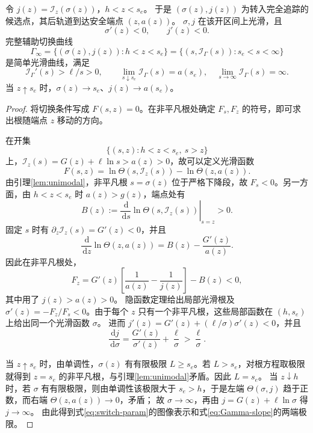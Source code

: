 \documentclass[lang=cn,a4paper,newtx]{elegantpaper}
\theoremstyle{plain}
\theoremstyle{definition}
\newcommand{\dd}{\,\mathrm d}
\begin{document}
\begin{proposition}[非平凡切换曲线的全分支]
\label{prop:Gamma-geometry}
令 $j(z)=\mathcal I_z(\sigma(z))$，$h<z<s_e$。
于是 $(\sigma(z),j(z))$ 为转入完全追踪的候选点，其后轨道到达安全端点 $(z,a(z))$。
$\sigma,j$ 在该开区间上光滑，且
\begin{equation}
\sigma'(z)<0,\qquad j'(z)<0.
\label{eq:sigma-monotone}
\end{equation}
完整辅助切换曲线
\begin{equation}
\Gamma_\infty=\{(\sigma(z),j(z)):h<z<s_e\}
=\{(s,\mathcal I_\Gamma(s)):s_e<s<\infty\}
\label{eq:switch-param}
\end{equation}
是简单光滑曲线，满足
\begin{equation}
\mathcal I_\Gamma'(s)>\ell/s>0,
\qquad
\lim_{s\downarrow s_e}\mathcal I_\Gamma(s)=a(s_e),\quad
\lim_{s\to\infty}\mathcal I_\Gamma(s)=\infty.
\label{eq:Gamma-slope}
\end{equation}
当 $z\uparrow s_e$ 时，$\sigma(z)\to s_e$、$j(z)\to a(s_e)$。
\end{proposition}
\begin{proof}
将切换条件写成 $F(s,z)=0$。在非平凡根处确定 $F_s,F_z$ 的符号，即可求出根随端点 $z$ 移动的方向。

在开集
\[
\{(s,z):h<z<s_e,\ s>z\}
\]
上，$\mathcal I_z(s)=G(z)+\ell\ln s>a(z)>0$，故可以定义光滑函数
\[
F(s,z)=\ln\Theta(s,\mathcal I_z(s))-\ln\Theta(z,a(z)).
\]
由引理\ref{lem:unimodal}，非平凡根 $s=\sigma(z)$ 位于严格下降段，故 $F_s<0$。另一方面，由 $h<z<s_e$ 时 $a(z)>g(z)$，端点处有
\[
B(z):=\left.\frac{\dd}{\dd s}\ln\Theta(s,\mathcal I_z(s))\right|_{s=z}>0.
\]
固定 $s$ 时有 $\partial_z\mathcal I_z(s)=G'(z)<0$，并且
\[
\frac{\dd}{\dd z}\ln\Theta(z,a(z))=B(z)-\frac{G'(z)}{a(z)}.
\]
因此在非平凡根处，
\[
F_z=G'(z)\left[\frac1{a(z)}-\frac1{j(z)}\right]-B(z)<0,
\]
其中用了 $j(z)>a(z)>0$。
隐函数定理给出局部光滑根及 $\sigma'(z)=-F_z/F_s<0$。由于每个 $z$ 只有一个非平凡根，这些局部函数在 $(h,s_e)$ 上给出同一个光滑函数 $\sigma$。
进而 $j'(z)=G'(z)+(\ell/\sigma)\sigma'(z)<0$，并且
\[
\frac{\dd j}{\dd\sigma}=\frac{G'(z)}{\sigma'(z)}+\frac\ell\sigma>\frac\ell\sigma.
\]

当 $z\uparrow s_e$ 时，由单调性，$\sigma(z)$ 有有限极限 $L\ge s_e$。若 $L>s_e$，对根方程取极限就得到 $z=s_e$ 的非平凡根，与引理\ref{lem:unimodal}矛盾。因此 $L=s_e$。
当 $z\downarrow h$ 时，若 $\sigma$ 有有限极限，则由单调性该极限大于 $s_e>h$，于是左端 $\Theta(\sigma,j)$ 趋于正数，而右端 $\Theta(z,a(z))\to0$，矛盾；
故 $\sigma\to\infty$，再由 $j=G(z)+\ell\ln\sigma$ 得 $j\to\infty$。
由此得到式\eqref{eq:switch-param}的图像表示和式\eqref{eq:Gamma-slope}的两端极限。
\end{proof}
\end{document}
